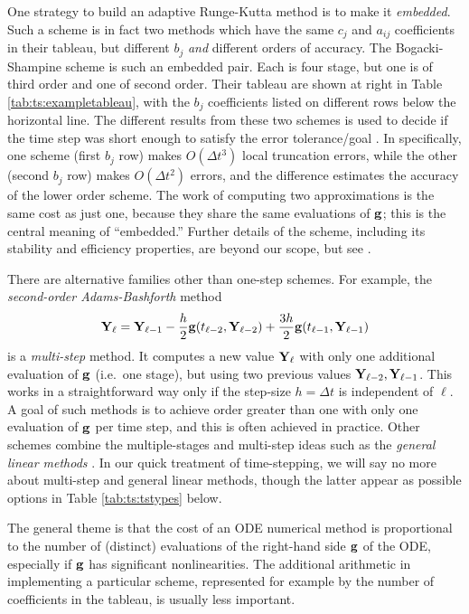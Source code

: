One strategy to build an adaptive Runge-Kutta method is to make it \emph{embedded}.  Such a scheme is in fact two methods which have the same $c_j$ and $a_{ij}$ coefficients in their tableau, but different $b_j$ \emph{and} different orders of accuracy.  The Bogacki-Shampine scheme \RKthreebs is such an embedded pair.  Each is four stage, but one is of third order and one of second order.  Their tableau are shown at right in Table \ref{tab:ts:exampletableau}, with the $b_j$ coefficients listed on different rows below the horizontal line.  The different results from these two schemes is used to decide if the time step was short enough to satisfy the error tolerance/goal \citep{Butcher2008}.  In \RKthreebs specifically, one scheme (first $b_j$ row) makes $O(\Delta t^3)$ local truncation errors, while the other (second $b_j$ row) makes $O(\Delta t^2)$ errors, and the difference estimates the accuracy of the lower order scheme.  The work of computing two approximations is the same cost as just one, because they share the same evaluations of $\mathbf{g}$; this is the central meaning of ``embedded.''  Further details of the \RKthreebs scheme, including its stability and efficiency properties, are beyond our scope, but see \citep{BogackiShampine1989}.

There are alternative families other than one-step schemes.  For example, the \emph{second-order Adams-Bashforth} method
\begin{equation}
\mathbf{Y}_\ell = \mathbf{Y}_{\ell-1} - \frac{h}{2} \mathbf{g}(t_{\ell-2},\mathbf{Y}_{\ell-2}) + \frac{3 h}{2} \mathbf{g}(t_{\ell-1},\mathbf{Y}_{\ell-1})  \label{eq:ts:ab2}
\end{equation}
is a \emph{multi-step} method.  It computes a new value $\mathbf{Y}_\ell$ with only one additional evaluation of $\mathbf{g}$ (i.e.~one stage), but using two previous values $\mathbf{Y}_{\ell-2},\mathbf{Y}_{\ell-1}$.  This works in a straightforward way only if the step-size $h=\Delta t$ is independent of $\ell$.  A goal of such methods is to achieve order greater than one with only one evaluation of $\mathbf{g}$ per time step, and this is often achieved in practice.  Other schemes combine the multiple-stages and multi-step ideas such as the \emph{general linear methods} \citep{Butcher2008}.  In our quick treatment of time-stepping, we will say no more about multi-step and general linear methods, though the latter appear as possible \PETSc options in Table \ref{tab:ts:tstypes} below.

The general theme is that the cost of an ODE numerical method is proportional to the number of (distinct) evaluations of the right-hand side $\mathbf{g}$ of the ODE, especially if $\mathbf{g}$ has significant nonlinearities.  The additional arithmetic in implementing a particular scheme, represented for example by the number of coefficients in the tableau, is usually less important.


